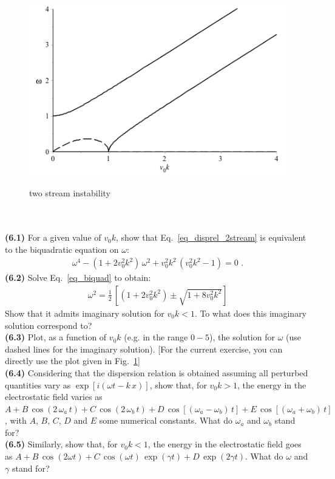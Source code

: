 \documentclass[10pt]{article}
\begin{document}
\begin{figure}
\resizebox{!}{50mm}
{\includegraphics{Fig_2stream.png}}
\caption{two stream instability}
\label{Fig_2stream}
\end{figure}

$ $\\
\\
{\bf (6.1)} For a given value of $v_0 k$, show that Eq.~\eqref{eq_disprel_2stream} is equivalent to the biquadratic equation on $\omega$:
\begin{eqnarray}\label{eq_biquad}
\omega^4 - (1+2 v_0^2 k^2)\,\omega^2 + v_0^2 k^2\,(v_0^2 k^2-1) = 0\,\,.
\end{eqnarray}
{\bf (6.2)} Solve Eq.~\eqref{eq_biquad} to obtain:
\begin{eqnarray}
\omega^2 = \frac{1}{2}\,\left[ (1+2 v_0^2 k^2) \pm \sqrt{1+8 v_0^2 k^2} \right]
\end{eqnarray}
Show that it admits imaginary solution for $v_0 k<1$. To what does this imaginary solution correspond to?\\
{\bf (6.3)} Plot, as a function of $v_0 k$ (e.g. in the range $0 - 5$),  the solution for $\omega$ (use dashed lines for the imaginary solution). [For the current exercise, you can directly use the plot given in Fig.~\ref{Fig_2stream}]\\
{\bf (6.4)} Considering that the dispersion relation is obtained assuming all perturbed quantities vary as $\exp[i(\omega t - k\,x)]$, show that, for $v_0 k>1$, the energy in the electrostatic field varies as $A + B\,\cos(2\,\omega_a\,t) + C\,\cos(2\,\omega_b\,t) + D\,\cos[(\omega_a-\omega_b)\,t] + E\,\cos[(\omega_a+\omega_b)\,t]$, with $A$, $B$, $C$, $D$ and $E$ some numerical constants. What do $\omega_a$ and $\omega_b$ stand for?\\
{\bf (6.5)} Similarly, show that, for $v_0 k<1$, the energy in the electrostatic field goes as $A + B\,\cos(2\omega t) + C\,\cos(\omega t)\,\exp(\gamma t)+D\,\exp(2\gamma t)$. What do $\omega$ and $\gamma$ stand for? 
\end{document}
